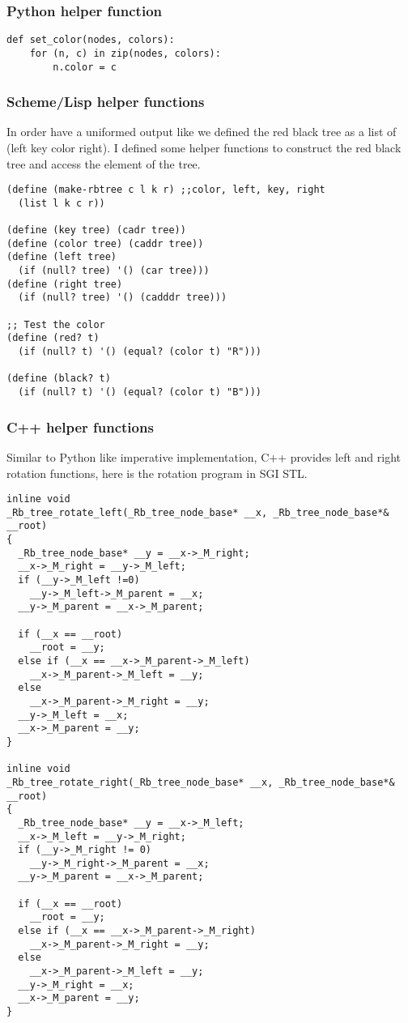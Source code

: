 \documentclass{article}
\begin{document}
\subsubsection*{Python helper function}
\lstset{language=Python}
\begin{lstlisting}
def set_color(nodes, colors):
    for (n, c) in zip(nodes, colors):
        n.color = c
\end{lstlisting}

\subsubsection*{Scheme/Lisp helper functions}

In order have a uniformed output like we defined the red black tree as a list of (left key color right).
I defined some helper functions to construct the red black tree and access the element of the tree.

\lstset{language=lisp}
\begin{lstlisting}
(define (make-rbtree c l k r) ;;color, left, key, right
  (list l k c r))

(define (key tree) (cadr tree))
(define (color tree) (caddr tree))
(define (left tree) 
  (if (null? tree) '() (car tree)))
(define (right tree)
  (if (null? tree) '() (cadddr tree)))

;; Test the color
(define (red? t)
  (if (null? t) '() (equal? (color t) "R")))

(define (black? t)
  (if (null? t) '() (equal? (color t) "B")))
\end{lstlisting}

\subsubsection*{C++ helper functions}

Similar to Python like imperative implementation, C++ provides left
and right rotation functions, here is the rotation program in SGI STL.

\lstset{language=c++}
\begin{lstlisting}
inline void 
_Rb_tree_rotate_left(_Rb_tree_node_base* __x, _Rb_tree_node_base*& __root)
{
  _Rb_tree_node_base* __y = __x->_M_right;
  __x->_M_right = __y->_M_left;
  if (__y->_M_left !=0)
    __y->_M_left->_M_parent = __x;
  __y->_M_parent = __x->_M_parent;

  if (__x == __root)
    __root = __y;
  else if (__x == __x->_M_parent->_M_left)
    __x->_M_parent->_M_left = __y;
  else
    __x->_M_parent->_M_right = __y;
  __y->_M_left = __x;
  __x->_M_parent = __y;
}

inline void 
_Rb_tree_rotate_right(_Rb_tree_node_base* __x, _Rb_tree_node_base*& __root)
{
  _Rb_tree_node_base* __y = __x->_M_left;
  __x->_M_left = __y->_M_right;
  if (__y->_M_right != 0)
    __y->_M_right->_M_parent = __x;
  __y->_M_parent = __x->_M_parent;

  if (__x == __root)
    __root = __y;
  else if (__x == __x->_M_parent->_M_right)
    __x->_M_parent->_M_right = __y;
  else
    __x->_M_parent->_M_left = __y;
  __y->_M_right = __x;
  __x->_M_parent = __y;
}
\end{lstlisting}
\end{document}
